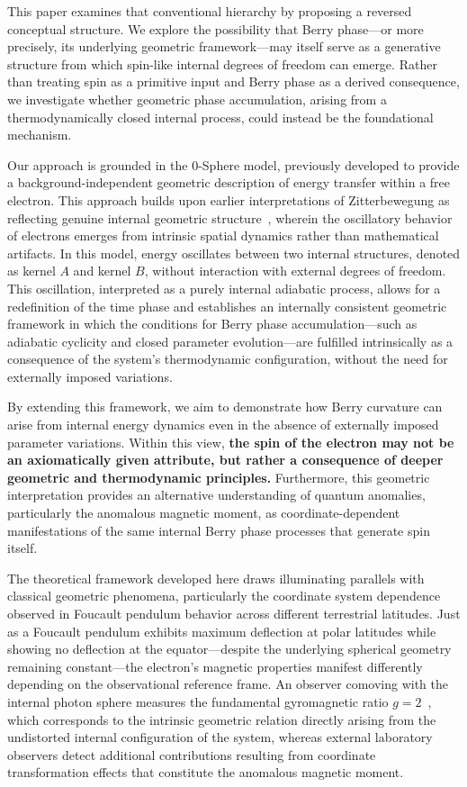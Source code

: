 \documentclass[%
 reprint,
 amsmath,amssymb,
 aps,
]{revtex4-1}
\numberwithin{equation}{section}%
\begin{document}
This paper examines that conventional hierarchy by proposing a reversed conceptual structure. We explore the possibility that Berry phase—or more precisely, its underlying geometric framework—may itself serve as a generative structure from which spin-like internal degrees of freedom can emerge. Rather than treating spin as a primitive input and Berry phase as a derived consequence, we investigate whether geometric phase accumulation, arising from a thermodynamically closed internal process, could instead be the foundational mechanism.

Our approach is grounded in the 0-Sphere model, previously developed to provide a background-independent geometric description of energy transfer within a free electron. This approach builds upon earlier interpretations of Zitterbewegung as reflecting genuine internal geometric structure~\cite{barut1981zitterbewegung}, wherein the oscillatory behavior of electrons emerges from intrinsic spatial dynamics rather than mathematical artifacts. In this model, energy oscillates between two internal structures, denoted as kernel $A$ and kernel $B$, without interaction with external degrees of freedom. This oscillation, interpreted as a purely internal adiabatic process, allows for a redefinition of the time phase and establishes an internally consistent geometric framework in which the conditions for Berry phase accumulation—such as adiabatic cyclicity and closed parameter evolution—are fulfilled intrinsically as a consequence of the system’s thermodynamic configuration, without the need for externally imposed variations.

By extending this framework, we aim to demonstrate how Berry curvature can arise from internal energy dynamics even in the absence of externally imposed parameter variations. Within this view, \textbf{the spin of the electron may not be an axiomatically given attribute, but rather a consequence of deeper geometric and thermodynamic principles.} Furthermore, this geometric interpretation provides an alternative understanding of quantum anomalies, particularly the anomalous magnetic moment, as coordinate-dependent manifestations of the same internal Berry phase processes that generate spin itself.

The theoretical framework developed here draws illuminating parallels with classical geometric phenomena, particularly the coordinate system dependence observed in Foucault pendulum behavior across different terrestrial latitudes. Just as a Foucault pendulum exhibits maximum deflection at polar latitudes while showing no deflection at the equator—despite the underlying spherical geometry remaining constant—the electron's magnetic properties manifest differently depending on the observational reference frame. An observer comoving with the internal photon sphere measures the fundamental gyromagnetic ratio $g = 2$~\cite{hanamura2309.0047}, which corresponds to the intrinsic geometric relation directly arising from the undistorted internal configuration of the system, whereas external laboratory observers detect additional contributions resulting from coordinate transformation effects that constitute the anomalous magnetic moment.
\end{document}
